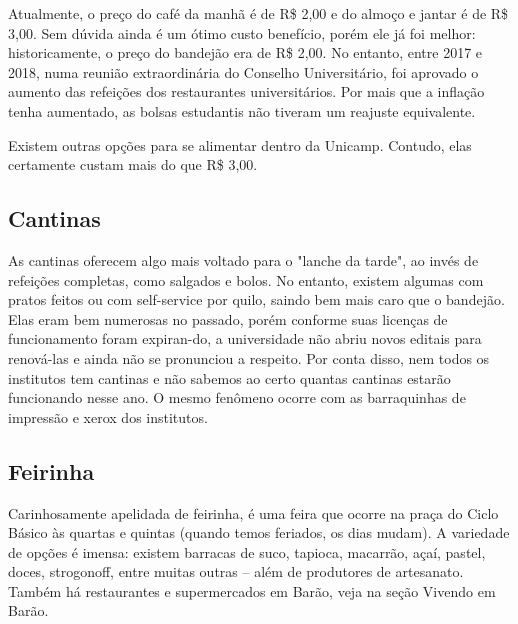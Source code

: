 Atualmente, o preço do café da manhã é de R\$ 2,00 e do almoço e jantar é de R\$
3,00. Sem dúvida ainda é um ótimo custo benefício, porém ele já foi melhor:
historicamente, o preço do bandejão era de R\$ 2,00. No entanto, entre 2017 e 2018,
numa reunião extraordinária do Conselho Universitário, foi aprovado o aumento das
refeições dos restaurantes universitários. Por mais que a inflação tenha aumentado, as
bolsas estudantis não tiveram um reajuste equivalente.

Existem outras opções para se alimentar dentro da Unicamp. Contudo, elas
certamente custam mais do que R\$ 3,00.

\subsection{Cantinas}

As cantinas oferecem algo mais voltado para o "lanche da tarde", ao invés de
refeições completas, como salgados e bolos. No entanto, existem algumas com pratos
feitos ou com self-service por quilo, saindo bem mais caro que o bandejão. Elas eram
bem numerosas no passado, porém conforme suas licenças de funcionamento foram
expiran-do, a universidade não abriu novos editais para renová-las e ainda não se
pronunciou a respeito. Por conta disso, nem todos os institutos tem cantinas e não
sabemos ao certo quantas cantinas estarão funcionando nesse ano. O mesmo fenômeno
ocorre com as barraquinhas de impressão e xerox dos institutos.

\subsection{Feirinha}

Carinhosamente apelidada de feirinha, é uma feira que ocorre na praça do Ciclo
Básico às quartas e quintas (quando temos feriados, os dias mudam). A variedade de
opções é imensa: existem barracas de suco, tapioca, macarrão, açaí, pastel, doces,
strogonoff, entre muitas outras – além de produtores de artesanato. Também há
restaurantes e supermercados em Barão, veja na seção Vivendo em Barão.